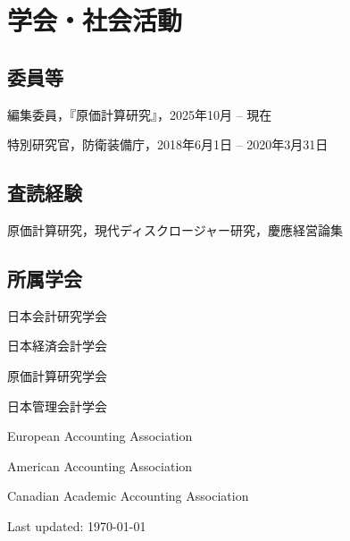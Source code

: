 \documentclass[letterpaper,11pt]{article}
\renewenvironment{itemize}{
  \begin{list}{}{
    \setlength{\leftmargin}{1.5em}
  }
}{
  \end{list}
}
\begin{document}
\section*{学会・社会活動}

\subsection*{委員等}

\begin{itemize}
    \item 編集委員，『原価計算研究』，2025年10月 -- 現在
    \item 特別研究官，防衛装備庁，2018年6月1日 -- 2020年3月31日
\end{itemize}

\subsection*{査読経験}
    \begin{itemize}
        \item 原価計算研究，現代ディスクロージャー研究，慶應経営論集
    \end{itemize}

\subsection*{所属学会}

\begin{itemize}
    \item 日本会計研究学会
    \item 日本経済会計学会
    \item 原価計算研究学会
    \item 日本管理会計学会
    \item European Accounting Association
    \item American Accounting Association
    \item Canadian Academic Accounting Association
\end{itemize}

\bigskip

\begin{center}
  \begin{footnotesize}
    Last updated: \today \\
  \end{footnotesize}
\end{center}
\end{document}
